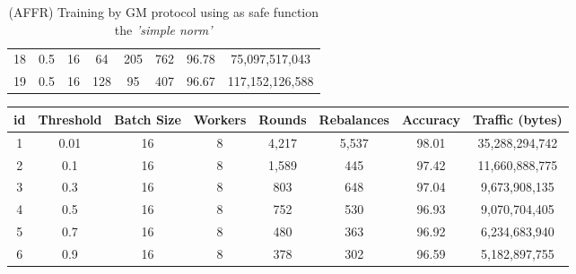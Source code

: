 \begin{table}[H]
\begin{tabular}{|c|c|c|c|c|c|c|c|}
        18                     & 0.5                   & 16                    & 64                    & 205                   & 762                   & 96.78                 & 75,097,517,043           \\
        19                     & 0.5                   & 16                    & 128                   & 95                    & 407                   & 96.67                 & 117,152,126,588          \\
        \hline
    \end{tabular}
    \caption{(AFFR) Training by GM protocol using as safe function the \emph{'simple norm'}}
    \label{tab:table-gm-sf1-nlp-exp}
\end{table}

\newpage

\begin{table}[H]
    \begin{tabular}{|c|c|c|c|c|c|c|c|}
        \hline
        \textbf{id}            & \textbf{Threshold}    & \textbf{Batch Size}   & \textbf{Workers}      & \textbf{Rounds}       & \textbf{Rebalances}   & \textbf{Accuracy}     & \textbf{Traffic (bytes)} \\
        \hline
        1                      & 0.01                  & 16                    & 8                     & 4,217                 & 5,537                 & 98.01                 & 35,288,294,742           \\
        2                      & 0.1                   & 16                    & 8                     & 1,589                 & 445                   & 97.42                 & 11,660,888,775           \\
        3                      & 0.3                   & 16                    & 8                     & 803                   & 648                   & 97.04                 & 9,673,908,135            \\
        4                      & 0.5                   & 16                    & 8                     & 752                   & 530                   & 96.93                 & 9,070,704,405            \\
        5                      & 0.7                   & 16                    & 8                     & 480                   & 363                   & 96.92                 & 6,234,683,940            \\
        6                      & 0.9                   & 16                    & 8                     & 378                   & 302                   & 96.59                 & 5,182,897,755            \\

\end{tabular}
\end{table}
